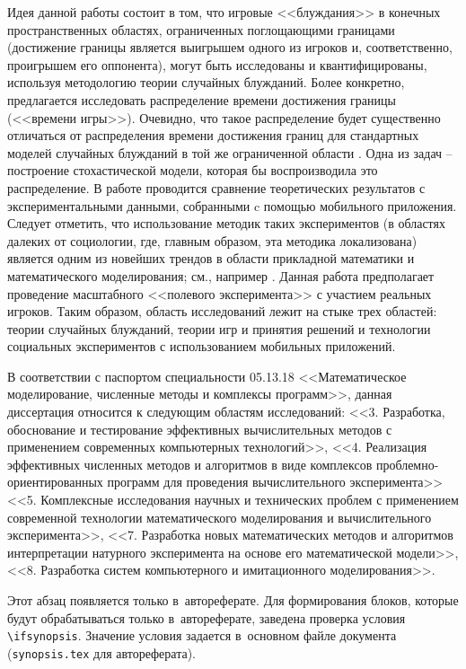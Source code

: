Идея данной работы состоит в том, что игровые <<блуждания>> в конечных пространственных областях, ограниченных поглощающими границами 
(достижение границы является выигрышем одного из игроков и, соответственно, проигрышем его оппонента), 
могут быть исследованы и квантифицированы, используя методологию теории случайных блужданий. Более конкретно, 
предлагается исследовать распределение времени достижения границы (<<времени игры>>). Очевидно, что такое распределение 
будет существенно отличаться от распределения времени достижения границ для стандартных моделей случайных блужданий 
в той же ограниченной области \cite{grebenkov_universal_2016}. Одна из задач -- построение стохастической модели, которая бы воспроизводила это распределение. 
В работе проводится сравнение теоретических результатов с экспериментальными данными, собранными c помощью мобильного приложения. 
Следует отметить, что использование методик таких экспериментов (в областях далеких от социологии, где, главным образом, эта методика локализована) 
является одним из новейших трендов в области прикладной математики и математического моделирования; 
см., например \cite{kearns_experimental_2006, shirado_locally_2017, lynn_human_2020}.
Данная работа предполагает проведение масштабного <<полевого эксперимента>> с участием реальных игроков. 
Таким образом, область исследований лежит на стыке трех областей: теории случайных блужданий, теории игр и принятия решений 
и технологии социальных экспериментов с использованием мобильных приложений. 

В соответствии с паспортом специальности 05.13.18 <<Математическое моделирование,
численные методы и комплексы программ>>, данная диссертация
относится к следующим областям исследований: <<3. Разработка, обоснование
и тестирование эффективных вычислительных методов с применением современных
компьютерных технологий>>, <<4. Реализация эффективных численных методов и алгоритмов в виде
комплексов проблемно-ориентированных программ для проведения
вычислительного эксперимента>> <<5. Комплексные исследования научных и
технических проблем с применением современной технологии математического
моделирования и вычислительного эксперимента>>, <<7. Разработка новых математических
методов и алгоритмов интерпретации натурного эксперимента на
основе его математической модели>>, <<8. Разработка систем компьютерного и имитационного моделирования>>.

\ifsynopsis
Этот абзац появляется только в~автореферате.
Для формирования блоков, которые будут обрабатываться только в~автореферате,
заведена проверка условия \verb!\!\verb!ifsynopsis!.
Значение условия задается в~основном файле документа (\verb!synopsis.tex! для
автореферата).
\else
\fi


